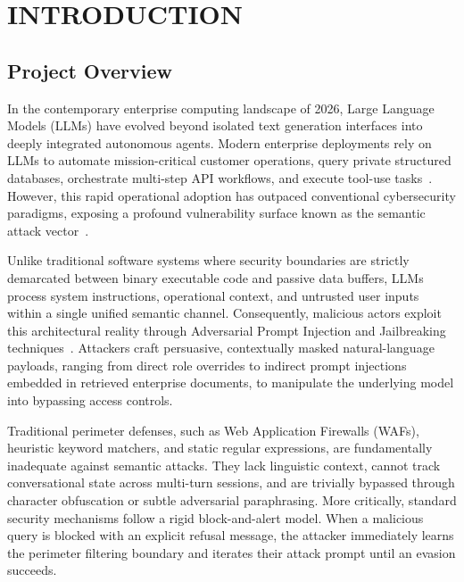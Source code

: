 \documentclass[12pt,a4paper,oneside]{report}
\begin{document}
\newpage

\setcounter{page}{1}

\chapter{INTRODUCTION}

\section{Project Overview}
In the contemporary enterprise computing landscape of 2026, Large Language Models (LLMs) have evolved beyond isolated text generation interfaces into deeply integrated autonomous agents. Modern enterprise deployments rely on LLMs to automate mission-critical customer operations, query private structured databases, orchestrate multi-step API workflows, and execute tool-use tasks~\cite{openai2023gpt4}. However, this rapid operational adoption has outpaced conventional cybersecurity paradigms, exposing a profound vulnerability surface known as the semantic attack vector~\cite{owasp2023top10}.

Unlike traditional software systems where security boundaries are strictly demarcated between binary executable code and passive data buffers, LLMs process system instructions, operational context, and untrusted user inputs within a single unified semantic channel. Consequently, malicious actors exploit this architectural reality through Adversarial Prompt Injection and Jailbreaking techniques~\cite{owasp2023top10}. Attackers craft persuasive, contextually masked natural-language payloads, ranging from direct role overrides to indirect prompt injections embedded in retrieved enterprise documents, to manipulate the underlying model into bypassing access controls.

Traditional perimeter defenses, such as Web Application Firewalls (WAFs), heuristic keyword matchers, and static regular expressions, are fundamentally inadequate against semantic attacks. They lack linguistic context, cannot track conversational state across multi-turn sessions, and are trivially bypassed through character obfuscation or subtle adversarial paraphrasing. More critically, standard security mechanisms follow a rigid block-and-alert model. When a malicious query is blocked with an explicit refusal message, the attacker immediately learns the perimeter filtering boundary and iterates their attack prompt until an evasion succeeds.
\end{document}
